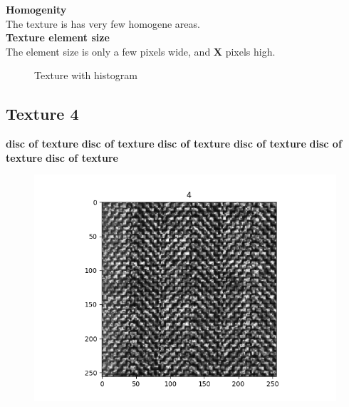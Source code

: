 \documentclass{article}
\begin{document}
\textbf{Homogenity}\\
The texture is has very few homogene areas.\\

\textbf{Texture element size}\\
The element size is only a few pixels wide, and \textbf{X} pixels high.


\begin{figure}[h]%
	\centering
    \qquad
    \caption{Texture with histogram}%
    \label{fig:IMG3}%
\end{figure}
\newpage

\subsection{Texture 4}
\textbf{disc of texture}
\textbf{disc of texture}
\textbf{disc of texture}
\textbf{disc of texture}
\textbf{disc of texture}
\textbf{disc of texture}
\begin{figure}[h!]
\includegraphics[scale=0.5]{4.png}
\end{figure}
\newpage
\end{document}

